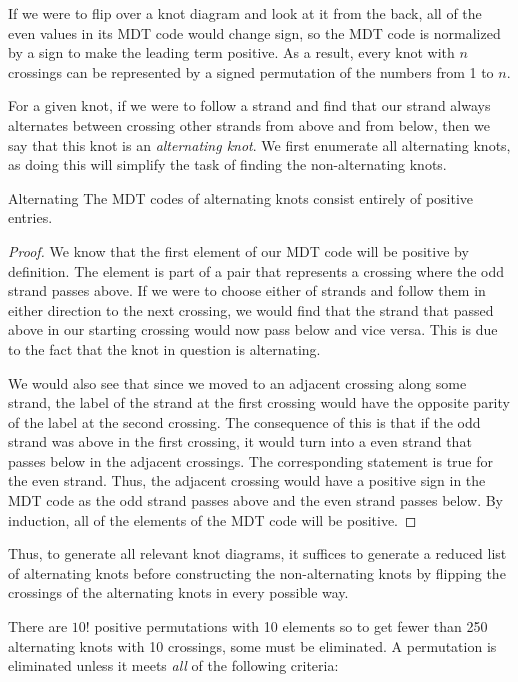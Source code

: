 \begin{paper}
If we were to flip over a knot diagram and look at it from the back, all of the
even values in its MDT code would change sign, so the MDT code is normalized by
a sign to make the leading term positive.
As a result, every knot with $n$ crossings can be represented by a signed
permutation of the numbers from 1 to $n$.


For a given knot, if we were to follow a strand and find that our strand always
alternates between crossing other strands from above and from below, then we
say that this knot is an \textit{alternating knot}.
We first enumerate all alternating knots, as doing this will simplify the task
of finding the non-alternating knots.

\begin{paperclm}{Alternating}
{The MDT codes of alternating knots consist entirely of positive entries.}
\end{paperclm}

\begin{proof}
We know that the first element of our MDT code will be positive by definition.
The element is part of a pair that represents a crossing where the odd strand
passes above.
If we were to choose either of strands and follow them in either direction to
the next crossing, we would find that the strand that passed above in our
starting crossing would now pass below and vice versa.
This is due to the fact that the knot in question is alternating.

We would also see that since we moved to an adjacent crossing along some strand,
the label of the strand at the first crossing would have the opposite parity of
the label at the second crossing.
The consequence of this is that if the odd strand was above in the first
crossing, it would turn into a even strand that passes below in the adjacent
crossings.
The corresponding statement is true for the even strand.
Thus, the adjacent crossing would have a positive sign in the MDT code as the
odd strand passes above and the even strand passes below.
By induction, all of the elements of the MDT code will be positive.
\end{proof}

Thus, to generate all relevant knot diagrams, it suffices to generate a reduced
list of alternating knots before constructing the non-alternating knots by
flipping the crossings of the alternating knots in every possible way.

There are $10!$ positive permutations with 10 elements so to get fewer than 250
alternating knots with 10 crossings, some must be eliminated.
A permutation is eliminated unless it meets \textit{all} of the following
criteria:


\end{paper}
